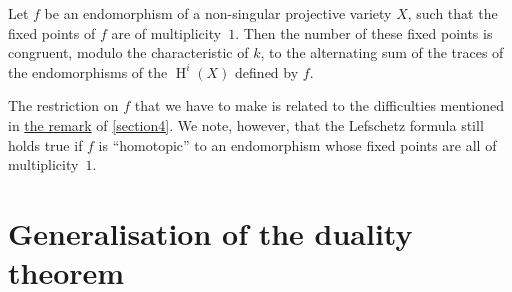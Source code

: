 \documentclass{article}
\theoremstyle{plain}
\newenvironment{theorem}[1]
  {\renewcommand\theinnercustomtheorem{#1}\innercustomtheorem}
  {\endinnercustomtheorem}
\theoremstyle{definition}
\DeclareMathOperator{\HH}{H}
\begin{document}
\begin{theorem}{5}
\label{theorem5}
  Let $f$ be an endomorphism of a non-singular projective variety $X$, such that the fixed points of $f$ are of multiplicity~$1$.
  Then the number of these fixed points is congruent, modulo the characteristic of $k$, to the alternating sum of the traces of the endomorphisms of the $\HH^i(X)$ defined by $f$.
\end{theorem}

The restriction on $f$ that we have to make is related to the difficulties mentioned in \hyperref[section4remark]{the remark} of \cref{section4}.
We note, however, that the Lefschetz formula still holds true if $f$ is ``homotopic'' to an endomorphism whose fixed points are all of multiplicity~$1$.


\section{Generalisation of the duality theorem}
\label{section8}
\end{document}
